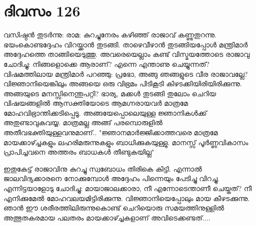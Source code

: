 \newpage
\section{ദിവസം 126}


വസിഷ്ഠന്‍ തുടര്‍ന്നു: രാമ: കുറച്ചുനേരം കഴിഞ്ഞ്‌ രാജാവ്‌ കണ്ണുതുറന്നു. ഭയംകൊണ്ടദ്ദേഹം വിറയ്ക്കാന്‍ തുടങ്ങി. താഴെവീഴാന്‍ തുടങ്ങിയപ്പോള്‍ മന്ത്രിമാര്‍ അദ്ദേഹത്തെ താങ്ങിയെടുത്തു. അവരെയെല്ലാം കണ്ട്‌ വിസ്മയത്തോടെ രാജാവു ചോദിച്ചു: നിങ്ങളൊക്കെ ആരാണ്‌? എന്നെ എന്താണു ചെയ്യുന്നത്‌? വിഷമത്തിലായ മന്ത്രിമാര്‍ പറഞ്ഞു: പ്രഭോ, അങ്ങു ഞങ്ങളുടെ വീര രാജാവല്ലേ? വിജ്ഞാനിയെങ്കിലും അങ്ങയെ ഒരു വിഭ്രമം പിടികൂടി കിഴടക്കിയിരിയിരിക്കുന്നു. അങ്ങയുടെ മനസ്സിനെന്തുപറ്റി? ഭാര്യ, മക്കള്‍ തുടങ്ങി തുലോം ചെറിയ വിഷയങ്ങളില്‍ ആസക്തിയോടെ ആമഗ്നരായവര്‍ മാത്രമേ മോഹവിഭ്രാന്തിക്കടിപ്പെടൂ. അങ്ങയേപ്പൊലെയുള്ള ജ്ഞാനികള്‍ക്ക്‌ അതുണ്ടാവുകവയ്യ. മാത്രമല്ല അങ്ങ്‌ പരമ്പൊരുളില്‍ അതീവഭക്തിയുള്ളവനുമാണ്‌.. "ജ്ഞാനമാര്‍ജ്ജിക്കാത്തവരെ മാത്രമേ മായക്കാഴ്ച്ചകളും ലഹരിമരുന്നുകളും ബാധിക്കുകയുള്ളു. മാനസ്സ്‌ പൂര്‍ണ്ണവികാസം പ്രാപിച്ചവനെ അത്തരം ബാധകള്‍ തീണ്ടുകയില്ല"

ഇതുകേട്ട്‌ രാജാവിനു കുറച്ചു സ്വബോധം തിരികെ കിട്ടി. എന്നാല്‍ ജാലവിദ്യക്കാരനെ നോക്കുമ്പോള്‍ അദ്ദേഹം പിന്നെയും പേടിച്ചു വിറച്ചു. എന്നിട്ടയാളോടു ചോദിച്ചു: മായാജാലക്കാരാ, നീ എന്നോടെന്താണീ ചെയ്തത്‌? നീ എനിക്കുമേല്‍ മോഹവലയമിട്ടിരിക്കുന്നു. വിജ്ഞാനിയെപ്പോലും മായ കീഴടക്കുന്നു. ഞാന്‍ ഈ ശരീരത്തിലിരുന്നുകൊണ്ട് ചെറിയൊരു സമയത്തിനുള്ളില്‍  അത്ഭുതകരമായ  പലതരം മായക്കാഴ്ച്ചകളാണ്‌ അവിടെക്കണ്ടത്‌....

